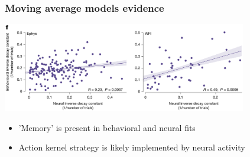 \documentclass{beamer}
\begin{document}
\begin{frame}
  \frametitle{Moving average models evidence}
  \begin{center}
    \includegraphics[width=0.8\textwidth, keepaspectratio]{./figure4f}
  \end{center}
  \begin{itemize}
    \item 'Memory' is present in behavioral and neural fits
    \item Action kernel strategy is likely implemented by neural activity
  \end{itemize}
\end{frame}
\end{document}
